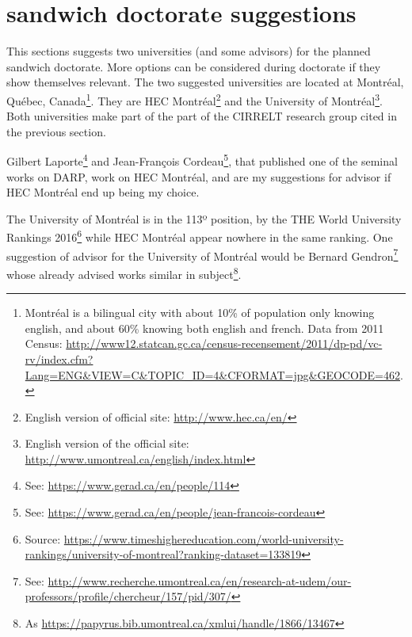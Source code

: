 \documentclass[english,plano-doutorado,twoside]{iiufrgs}
\begin{document}
\iffalse
This section presents some research groups that work with optimization problems related to DARP, or more generally VRP and PDVRP.

\begin{itemize}
\item \textbf{Portuguese group name:} description.
\item \textbf{Portuguese group name:} description.
\item \textbf{Portuguese group name:} description.
\item \textbf{\textit{ENGLISH NAME:}} description. 
\end{itemize}
\fi

\section{sandwich doctorate suggestions}
\label{sec:sandwich}
This sections suggests two universities (and some advisors) for the planned sandwich doctorate. More options can be considered during doctorate if they show themselves relevant. The two suggested universities are located at Montréal, Québec, Canada\footnote{Montréal is a bilingual city with about 10\% of population only knowing english, and about 60\% knowing both english and french. Data from 2011 Census: \url{http://www12.statcan.gc.ca/census-recensement/2011/dp-pd/vc-rv/index.cfm?Lang=ENG&VIEW=C&TOPIC_ID=4&CFORMAT=jpg&GEOCODE=462}.}. They are HEC Montréal\footnote{English version of official site: \url{http://www.hec.ca/en/}} and the University of Montréal\footnote{English version of the official site: \url{http://www.umontreal.ca/english/index.html}}. Both universities make part of the part of the CIRRELT research group cited in the previous section.

Gilbert Laporte\footnote{See: \url{https://www.gerad.ca/en/people/114}} and Jean-François Cordeau\footnote{See: \url{https://www.gerad.ca/en/people/jean-francois-cordeau}}, that published one of the seminal works on DARP\cite{cordeau_dial_ride_2007}, work on HEC Montréal, and are my suggestions for advisor if HEC Montréal end up being my choice.

The University of Montréal is in the 113º position, by the THE World University Rankings 2016\footnote{Source: \url{https://www.timeshighereducation.com/world-university-rankings/university-of-montreal?ranking-dataset=133819}} while HEC Montréal appear nowhere in the same ranking. One suggestion of advisor for the University of Montréal would be Bernard Gendron\footnote{See: \url{http://www.recherche.umontreal.ca/en/research-at-udem/our-professors/profile/chercheur/157/pid/307/}} whose already advised works similar in subject\footnote{As \url{https://papyrus.bib.umontreal.ca/xmlui/handle/1866/13467}}.
\end{document}
